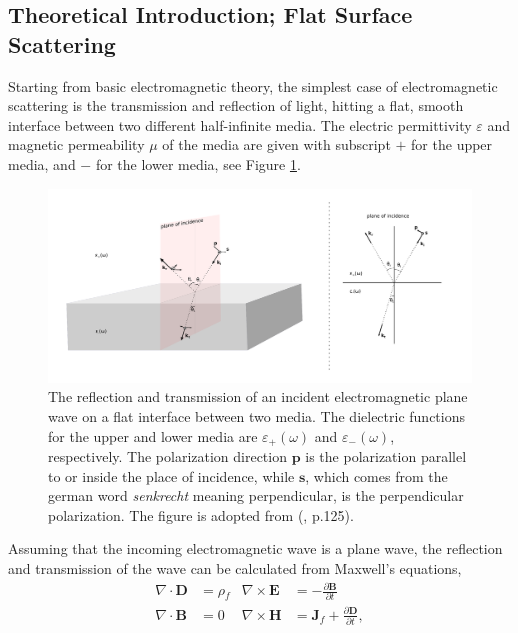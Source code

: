 \subsection{Theoretical Introduction; Flat Surface Scattering} \label{sectionFlatScattering}
Starting from basic electromagnetic theory, the simplest case 
of electromagnetic scattering is the transmission and reflection of light, hitting a flat,
smooth interface between two different half-infinite media. 
The electric permittivity $\varepsilon$ and magnetic permeability $\mu$ of the media are given 
with subscript $+$ for the upper media, and $-$ for the lower media, see Figure \ref{fig:flatScattering}. 
\begin{figure}[h!]
  \centering
   \includegraphics[width=1.0\textwidth]{Figures/flatSurfaceScattering.pdf}
   \caption{The reflection and transmission of an incident electromagnetic plane wave on a flat interface
      between two media. The dielectric functions for the upper and lower media are $\varepsilon_{+}(\omega)$
      and  $\varepsilon_{-}(\omega)$, respectively. The polarization direction $\boldsymbol{p}$ is the
      polarization parallel to or inside the place of incidence, while $\boldsymbol{s}$, which comes from the
      german word \textit{senkrecht} meaning perpendicular, is the perpendicular polarization.
      The figure is adopted from (\cite{Lazzari2002}, p.125).
   }
   \label{fig:flatScattering}
\end{figure}
Assuming that the incoming electromagnetic wave is a plane wave, the reflection and transmission
of the wave can be calculated from Maxwell's equations,
%
\begin{subequations}
\label{ME}
\begin{align}
   \nabla \cdot \boldsymbol{D} &= \rho \!_f           &\nabla\times\boldsymbol{E} &= - \frac{\partial \boldsymbol{B}}{\partial t} \label{ME1}\\
   \nabla \cdot \boldsymbol{B} &= 0                &\nabla \times \boldsymbol{H}&= \boldsymbol{J}\!_f + \frac{\partial \boldsymbol{D}}{\partial t}, \label{ME2}
\end{align}
\end{subequations}
